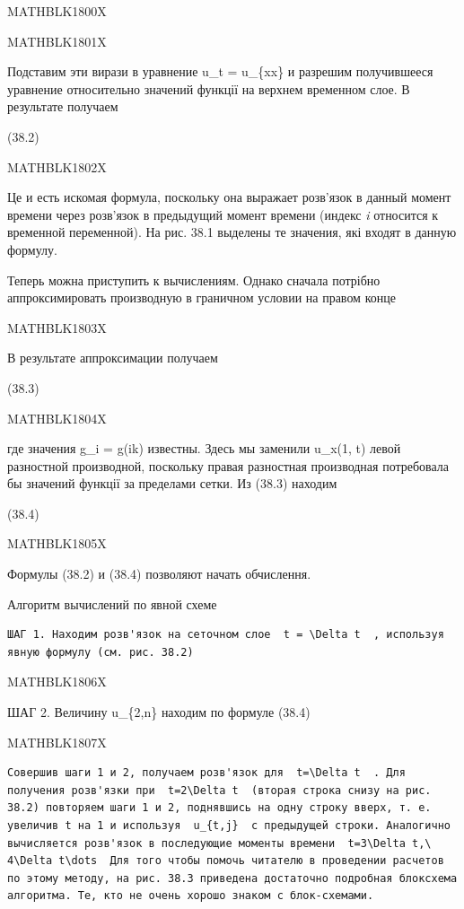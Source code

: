 \documentclass[
  ukrainian,
]{article}
\begin{document}
MATHBLK1800X

MATHBLK1801X

Подставим эти вирази в уравнение u\_t = u\_\{xx\} и разрешим
получившееся уравнение относительно значений функції на верхнем
временном слое. В результате получаем

(38.2)

MATHBLK1802X

Це и есть искомая формула, поскольку она выражает розв'язок в данный
момент времени через розв'язок в предыдущий момент времени (индекс
\emph{i} относится к временной переменной). На рис. 38.1 выделены те
значения, які входят в данную формулу.

Теперь можна приступить к вычислениям. Однако сначала потрібно
аппроксимировать производную в граничном условии на правом конце

MATHBLK1803X

В результате аппроксимации получаем

(38.3)

MATHBLK1804X

где значения g\_i = g(ik) известны. Здесь мы заменили u\_x(1, t) левой
разностной производной, поскольку правая разностная производная
потребовала бы значений функції за пределами сетки. Из (38.3) находим

(38.4)

MATHBLK1805X

Формулы (38.2) и (38.4) позволяют начать обчислення.

Алгоритм вычислений по явной схеме

\begin{verbatim}
ШАГ 1. Находим розв'язок на сеточном слое  t = \Delta t  , используя явную формулу (см. рис. 38.2)
\end{verbatim}

MATHBLK1806X

ШАГ 2. Величину u\_\{2,n\} находим по формуле (38.4)

MATHBLK1807X

\begin{verbatim}
Совершив шаги 1 и 2, получаем розв'язок для  t=\Delta t  . Для получения розв'язки при  t=2\Delta t  (вторая строка снизу на рис. 38.2) повторяем шаги 1 и 2, поднявшись на одну строку вверх, т. е. увеличив t на 1 и используя  u_{t,j}  с предыдущей строки. Аналогично вычисляется розв'язок в последующие моменты времени  t=3\Delta t,\ 4\Delta t\dots  Для того чтобы помочь читателю в проведении расчетов по этому методу, на рис. 38.3 приведена достаточно подробная блоксхема алгоритма. Те, кто не очень хорошо знаком с блок-схемами.
\end{verbatim}
\end{document}
